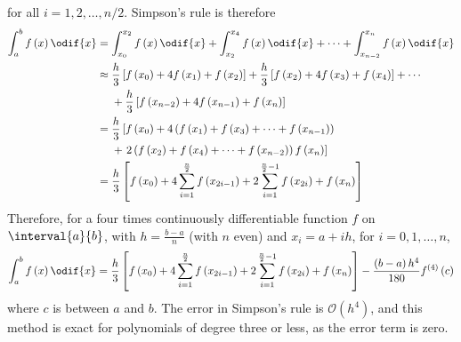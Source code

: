 \documentclass{article}
\begin{document}
for all \(i = 1, 2, \ldots, n/2\). Simpson's rule is therefore
\begin{align*}
    \int_a^b f\left( x \right) \odif{x} & = \int_{x_0}^{x_2} f\left( x \right) \odif{x} + \int_{x_2}^{x_4} f\left( x \right) \odif{x} + \cdots + \int_{x_{n - 2}}^{x_n} f\left( x \right) \odif{x}                                   \\
                                        & \approx
    \begin{aligned}[t]
         & \frac{h}{3} \left[ f\left( x_0 \right) + 4f\left( x_1 \right) + f\left( x_2 \right) \right] + \frac{h}{3} \left[ f\left( x_2 \right) + 4f\left( x_3 \right) + f\left( x_4 \right) \right] + \cdots \\
         & + \frac{h}{3} \left[ f\left( x_{n - 2} \right) + 4f\left( x_{n - 1} \right) + f\left( x_n \right) \right]
    \end{aligned}
    \\
                                        & =
    \begin{aligned}[t]
         & \frac{h}{3} \left[ f\left( x_0 \right) + 4 \left( f\left( x_1 \right) + f\left( x_3 \right) + \cdots + f\left( x_{n - 1} \right) \right) \right. \\
         & + \left. 2 \left( f\left( x_2 \right) + f\left( x_4 \right) + \cdots + f\left( x_{n - 2} \right) \right) f\left( x_n \right) \right]
    \end{aligned}
    \\
                                        & = \frac{h}{3} \left[ f\left( x_0 \right) + 4 \sum_{i = 1}^{\frac{n}{2}} f\left( x_{2i - 1} \right) + 2 \sum_{i = 1}^{\frac{n}{2} - 1} f\left( x_{2i} \right) + f\left( x_n \right) \right]
\end{align*}
Therefore, for a four times continuously differentiable function \(f\)
on \(\interval{a}{b}\), with \(h = \frac{b - a}{n}\) (with \(n\) even)
and \(x_i = a + i h\), for \(i = 0, 1, \ldots, n\),
\begin{equation*}
    \int_a^b f\left( x \right) \odif{x} = \frac{h}{3} \left[ f\left( x_0 \right) + 4 \sum_{i = 1}^{\frac{n}{2}} f\left( x_{2i - 1} \right) + 2 \sum_{i = 1}^{\frac{n}{2} - 1} f\left( x_{2i} \right) + f\left( x_n \right) \right] - \frac{\left( b - a \right) h^4}{180} f^{\left( 4 \right)}\left( c \right)
\end{equation*}
where \(c\) is between \(a\) and \(b\). The error in Simpson's rule is
\(\mathcal{O}\left( h^4 \right)\), and this method is exact for
polynomials of degree three or less, as the error term is zero.
\end{document}
